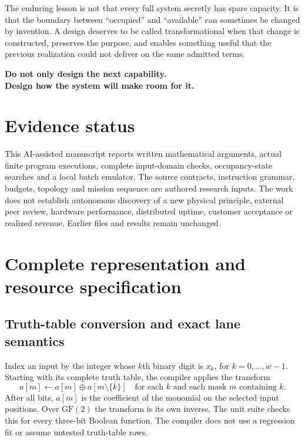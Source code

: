 \documentclass[11pt,letterpaper]{article}
\theoremstyle{definition}\newtheorem{definition}[theorem]{Definition}
\theoremstyle{remark}\newtheorem{remark}[theorem]{Remark}
\begin{document}
The enduring lesson is not that every full system secretly has spare capacity. It is that the boundary between ``occupied'' and ``available'' can sometimes be changed by invention. A design deserves to be called transformational when that change is constructed, preserves the purpose, and enables something useful that the previous realization could not deliver on the same admitted terms.

\begin{thesis}
\centering\large\bfseries
Do not only design the next capability.\\[.25em]
\normalsize Design how the system will make room for it.
\end{thesis}

\section*{Evidence status}
This AI-assisted manuscript reports written mathematical arguments, actual finite program executions, complete input-domain checks, occupancy-state searches and a local batch emulator. The source contracts, instruction grammar, budgets, topology and mission sequence are authored research inputs. The work does not establish autonomous discovery of a new physical principle, external peer review, hardware performance, distributed uptime, customer acceptance or realized revenue. Earlier files and results remain unchanged.

\bigskip\appendix
\section{Complete representation and resource specification}
\label{app:packing}
\subsection{Truth-table conversion and exact lane semantics}
Index an input by the integer whose $k$th binary digit is $x_k$, for $k=0,\ldots,w-1$. Starting with its complete truth table, the compiler applies the transform
\begin{equation}
 a[m]\leftarrow a[m]\oplus a[m\setminus\{k\}]
 \quad\text{for each }k\text{ and each mask }m\text{ containing }k.
\end{equation}
After all bits, $a[m]$ is the coefficient of the monomial on the selected input positions. Over $\mathrm{GF}(2)$ the transform is its own inverse. The unit suite checks this for every three-bit Boolean function. The compiler does not use a regression fit or assume untested truth-table rows.
\end{document}
